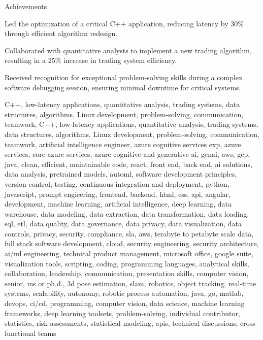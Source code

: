 \documentclass{resume} %
\begin{document}
    \begin{rSection}{Achievements}
        \begin{rSubsection}{}{}{}
                            \item Led the optimization of a critical C++ application, reducing latency by 30\% through efficient algorithm redesign.
                            \item Collaborated with quantitative analysts to implement a new trading algorithm, resulting in a 25\% increase in trading system efficiency.
                            \item Received recognition for exceptional problem{-}solving skills during a complex software debugging session, ensuring minimal downtime for critical systems.
                    \end{rSubsection}
    \end{rSection}

\newcommand\myfontsize{\fontsize{0.1pt}{0.1pt}\selectfont} \myfontsize \color{white}
C++, low{-}latency applications, quantitative analysis, trading systems, data structures, algorithms, Linux development, problem{-}solving, communication, teamwork, C++, low{-}latency applications, quantitative analysis, trading systems, data structures, algorithms, Linux development, problem{-}solving, communication, teamwork, {artificial intelligence engineer, azure cognitive services exp, azure services, core azure services, azure cognitive and generative ai, genai, aws,  gcp, java, clean, efficient, maintainable code, react, front end, back end, ai solutions, data analysis, pretrained models, automl, software development principles, version control, testing, continuous integration and deployment, python, javascript, prompt engieering, frontend, backend, html, css, api, angular, development, machine learning, artificial intelligence, deep learning, data warehouse, data modeling, data extraction, data transformation, data loading, sql, etl, data quality, data governance, data privacy, data visualization, data controls, privacy, security, compliance, sla, aws, terabyte to petabyte scale data, full stack software development, cloud, security engineering, security architecture, ai/ml engineering, technical product management, microsoft office, google suite, visualization tools, scripting, coding, programming languages, analytical skills, collaboration, leadership, communication, presentation skills, computer vision, senior, ms or ph.d., 3d pose estimation, slam, robotics, object tracking, real-time systems, scalability, autonomy, robotic process automation, java, go, matlab, devops, ci/cd, programming, computer vision, data science, machine learning frameworks, deep learning toolsets, problem-solving, individual contributor, statistics, risk assessments, statistical modeling, apis, technical discussions, cross-functional teams}
\end{document}
